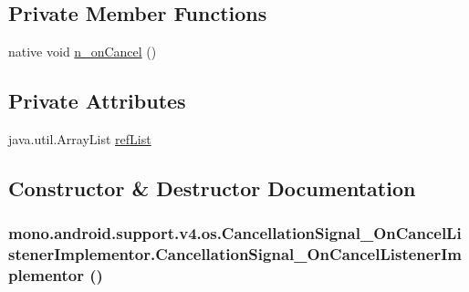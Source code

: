 \subsection*{Private Member Functions}
\begin{CompactItemize}
\item 
native void \hyperlink{classmono_1_1android_1_1support_1_1v4_1_1os_1_1_cancellation_signal___on_cancel_listener_implementor_bb1907546e25a4019b4481e75b01f8e2}{n\_\-onCancel} ()
\end{CompactItemize}
\subsection*{Private Attributes}
\begin{CompactItemize}
\item 
java.util.ArrayList \hyperlink{classmono_1_1android_1_1support_1_1v4_1_1os_1_1_cancellation_signal___on_cancel_listener_implementor_76c69289cc3882ce8bdf0c600da13b8a}{refList}
\end{CompactItemize}


\subsection{Constructor \& Destructor Documentation}
\hypertarget{classmono_1_1android_1_1support_1_1v4_1_1os_1_1_cancellation_signal___on_cancel_listener_implementor_d8833421059b8edadb0944e0e3963a24}{
\subsubsection[{CancellationSignal\_\-OnCancelListenerImplementor}]{\setlength{\rightskip}{0pt plus 5cm}mono.android.support.v4.os.CancellationSignal\_\-OnCancelListenerImplementor.CancellationSignal\_\-OnCancelListenerImplementor ()}}
\label{classmono_1_1android_1_1support_1_1v4_1_1os_1_1_cancellation_signal___on_cancel_listener_implementor_d8833421059b8edadb0944e0e3963a24}




